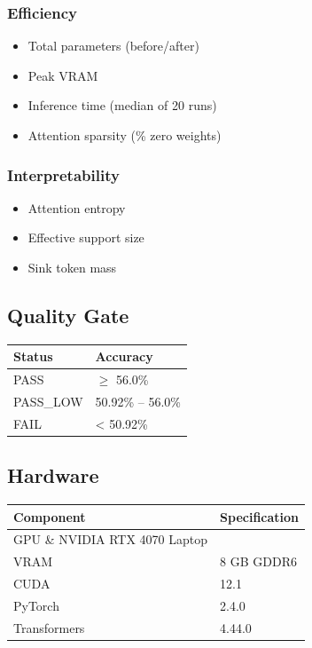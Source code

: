 \subsubsection{Efficiency}
\begin{itemize}
\item Total parameters (before/after)
\item Peak VRAM
\item Inference time (median of 20 runs)
\item Attention sparsity (\% zero weights)

\end{itemize}
\subsubsection{Interpretability}
\begin{itemize}
\item Attention entropy
\item Effective support size
\item Sink token mass

\end{itemize}
\subsection{Quality Gate}

\begin{table}[H]
\centering
\small
\begin{tabular}{ll}
\toprule
\textbf{Status} & \textbf{Accuracy} \\
\midrule
PASS & $\ge$ 56.0\% \\
PASS\_LOW & 50.92\% -- 56.0\% \\
FAIL & \textless{} 50.92\% \\
\bottomrule
\end{tabular}
\end{table}

\subsection{Hardware}

\begin{table}[H]
\centering
\small
\begin{tabular}{ll}
\toprule
\textbf{Component} & \textbf{Specification} \\
\midrule
GPU \& NVIDIA RTX 4070 Laptop \\
VRAM & 8 GB GDDR6 \\
CUDA & 12.1 \\
PyTorch & 2.4.0 \\
Transformers & 4.44.0 \\
\bottomrule
\end{tabular}
\end{table}

